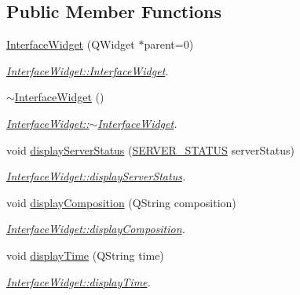 \subsection*{\-Public \-Member \-Functions}
\begin{DoxyCompactItemize}
\item 
\hyperlink{class_interface_widget_adddb54676e57004c5cc562d90c36d83c}{\-Interface\-Widget} (\-Q\-Widget $\ast$parent=0)
\begin{DoxyCompactList}\small\item\em \hyperlink{class_interface_widget_adddb54676e57004c5cc562d90c36d83c}{\-Interface\-Widget\-::\-Interface\-Widget}. \end{DoxyCompactList}\item 
\hyperlink{class_interface_widget_a7ac11d16b11cf435594e38b098176217}{$\sim$\-Interface\-Widget} ()
\begin{DoxyCompactList}\small\item\em \hyperlink{class_interface_widget_a7ac11d16b11cf435594e38b098176217}{\-Interface\-Widget\-::$\sim$\-Interface\-Widget}. \end{DoxyCompactList}\item 
void \hyperlink{class_interface_widget_a70f09b9d06d0f202a995b12a087a910d}{display\-Server\-Status} (\hyperlink{_interface_widget_8hpp_acf938af120b82076e10141155fe5ef9b}{\-S\-E\-R\-V\-E\-R\-\_\-\-S\-T\-A\-T\-U\-S} server\-Status)
\begin{DoxyCompactList}\small\item\em \hyperlink{class_interface_widget_a70f09b9d06d0f202a995b12a087a910d}{\-Interface\-Widget\-::display\-Server\-Status}. \end{DoxyCompactList}\item 
void \hyperlink{class_interface_widget_ac9c49591613a6ca657fae9c11d256eb1}{display\-Composition} (\-Q\-String composition)
\begin{DoxyCompactList}\small\item\em \hyperlink{class_interface_widget_ac9c49591613a6ca657fae9c11d256eb1}{\-Interface\-Widget\-::display\-Composition}. \end{DoxyCompactList}\item 
void \hyperlink{class_interface_widget_aa0286660e6d0ceb3ca19c378b44c59e1}{display\-Time} (\-Q\-String time)
\begin{DoxyCompactList}\small\item\em \hyperlink{class_interface_widget_aa0286660e6d0ceb3ca19c378b44c59e1}{\-Interface\-Widget\-::display\-Time}. \end{DoxyCompactList}\item 

\end{DoxyCompactItemize}
